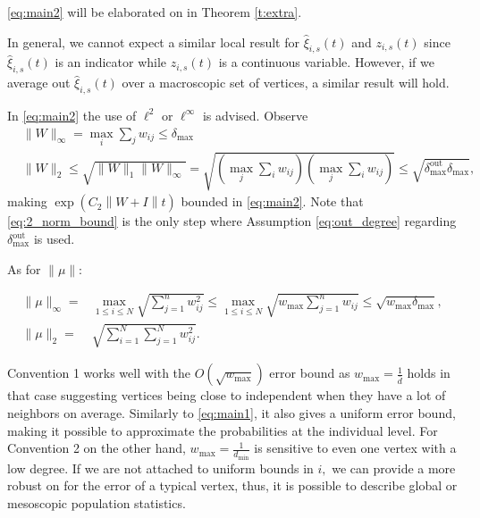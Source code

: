 \documentclass{article}
\newcommand{\1}[1]{{\mathds{1}}_{\left\{#1\right\}}}
\begin{document}
	\eqref{eq:main2} will be elaborated on in Theorem \ref{t:extra}. 
	
	In general, we cannot expect a similar local result for $\hat{\xi}_{i,s}(t)$ and $z_{i,s}(t)$ since $\hat{\xi}_{i,s}(t)$ is an indicator while $z_{i,s}(t)$ is a continuous variable. However, if we average out $\hat{\xi}_{i,s}(t)$ over a macroscopic set of vertices, a similar result will hold.
	
	In \eqref{eq:main2} the use of $\ell^2$ or $\ell^{\infty}$ is advised. Observe
		\begin{align}
		\nonumber
		&\|W \|_\infty=\max_{i} \sum_{j}w_{ij} \leq \delta_{\textrm{max}} \\
		\label{eq:2_norm_bound}
		& \|W \|_2 \leq \sqrt{\|W \|_1 \|W \|_{\infty}}=\sqrt{\left(\max_{j} \sum_{i}w_{ij}\right)\left(\max_{j} \sum_{i}w_{ij}\right)} \leq \sqrt{\delta_{\textrm{max}}^{\textrm{out}}\delta_{\textrm{max}}}, 
	\end{align}
	making $\exp\left(C_2\left\|W+I\right \|t \right)$ bounded in \eqref{eq:main2}. Note that \eqref{eq:2_norm_bound} is the only step where Assumption \eqref{eq:out_degree} regarding $\delta_{\textrm{max}}^{\textrm{out}}$ is used.

	As for $\|\mu \|$:
	
	\begin{align*}
		\|\mu \|_{\infty}=&\max_{1 \leq i \leq N} \sqrt{\sum_{j=1}^{n}w_{ij}^2} \leq \max_{1 \leq i \leq N} \sqrt{w_{\textrm{max}}\sum_{j=1}^{n}w_{ij}} \leq \sqrt{w_{\textrm{max}} \delta_{\textrm{max}}},  \\	
		\|\mu \|_{2}=&\sqrt{\sum_{i=1}^{N}\sum_{j=1}^N w_{ij}^2}.
	\end{align*}
	
	Convention 1 works well with the $O \left(\sqrt{w_{\textrm{max}}} \right)$ error bound as $w_{\textrm{max}}=\frac{1}{\bar{d}}$ holds in that case suggesting vertices being close to independent when they have a lot of neighbors on average. Similarly to \eqref{eq:main1}, it also gives a uniform error bound, making it possible to approximate the probabilities at the individual level. For Convention 2 on the other hand, $w_{\textrm{max}}=\frac{1}{d_{\min}}$  is sensitive to even one vertex with a low degree. If we are not attached to uniform bounds in $i,$ we can provide a more robust on for the error of a typical vertex, thus, it is possible to describe global or mesoscopic population statistics.
	
\end{document}
